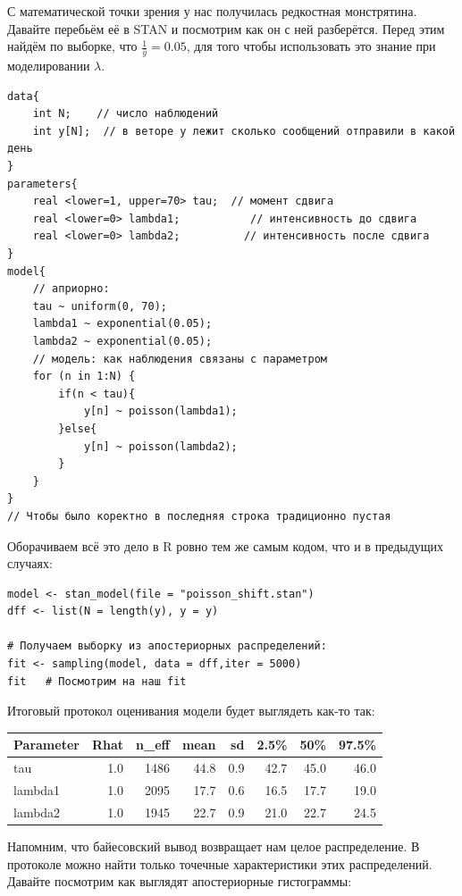 \documentclass[12pt, a4paper, oneside]{extreport}
\theoremstyle{plain}              %
\theoremstyle{definition}         %
\begin{document}
С математической точки зрения у нас получилась редкостная монстрятина. Давайте перебьём её в STAN и посмотрим как он с ней разберётся.  Перед этим найдём по выборке, что $\frac{1}{\bar y} = 0.05$, для того чтобы использовать это знание при моделировании $\lambda$. 

\begin{verbatim}
data{
    int N;    // число наблюдений
    int y[N];  // в веторе y лежит сколько сообщений отправили в какой день
}
parameters{
    real <lower=1, upper=70> tau;  // момент сдвига
    real <lower=0> lambda1;           // интенсивность до сдвига
    real <lower=0> lambda2;          // интенсивность после сдвига
}
model{
    // априорно:
    tau ~ uniform(0, 70); 
    lambda1 ~ exponential(0.05);
    lambda2 ~ exponential(0.05);
    // модель: как наблюдения связаны с параметром
    for (n in 1:N) {
        if(n < tau){
            y[n] ~ poisson(lambda1); 
        }else{
            y[n] ~ poisson(lambda2); 
        }
    }
}
// Чтобы было коректно в последняя строка традиционно пустая
\end{verbatim}


Оборачиваем всё это дело в R ровно тем же самым кодом, что и в предыдущих случаях: 

\begin{verbatim}
model <- stan_model(file = "poisson_shift.stan")
dff <- list(N = length(y), y = y)

# Получаем выборку из апостериорных распределений:
fit <- sampling(model, data = dff,iter = 5000)
fit   # Посмотрим на наш fit 
\end{verbatim}

Итоговый протокол оценивания модели будет выглядеть как-то так: 

\begin{table}[H]
	\centering
	\begin{tabular}{lrrrrrrr}
		\toprule
		Parameter & Rhat & n\_eff & mean & sd & 2.5\% & 50\% & 97.5\% \\ 
		\midrule
		tau & 1.0 & 1486 & 44.8 & 0.9 & 42.7 & 45.0 & 46.0 \\ 
		lambda1 & 1.0 & 2095 & 17.7 & 0.6 & 16.5 & 17.7 & 19.0 \\ 
		lambda2 & 1.0 & 1945 & 22.7 & 0.9 & 21.0 & 22.7 & 24.5 \\ 
		\bottomrule
	\end{tabular}
\end{table}

Напомним, что байесовский вывод возвращает нам целое распределение. В протоколе можно найти только точечные характеристики этих распределений. Давайте посмотрим как выглядят апостериорные гистограммы: 
\end{document}
